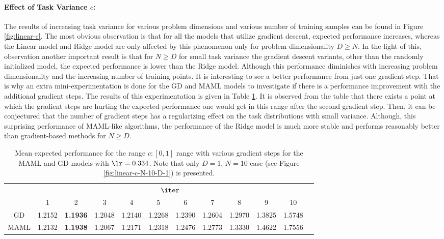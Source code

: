 \paragraph{Effect of Task Variance $c$:} The results of increasing task variance for various problem dimensions and various number of training samples can be found in Figure \ref{fig:linear-c}. The most obvious observation is that for all the models that utilize gradient descent, expected performance increases, whereas the Linear model and Ridge model are only affected by this phenomenon only for problem dimensionality $D\geq N$. In the light of this, observation another important result is that for $N\geq D$  for small task variance the gradient descent variants, other than the randomly initialized model, the expected performance is lower than the Ridge model. Although this performance diminishes with increasing problem dimensionality and the increasing number of training points. It is interesting to see a better performance from just one gradient step. That is why an extra mini-experimentation is done for the GD and MAML models to investigate if there is a performance improvement with the additional gradient steps. The results of this experimentation is given in Table \ref{tab:zoom}. It is observed from the table that there exists a point at which the gradient steps are hurting the expected performance one would get in this range after the second gradient step. Then, it can be conjectured that the number of gradient steps has a regularizing effect on the task distributions with small variance. Although, this surprising performance of MAML-like algorithms, the performance of the Ridge model is much more stable and performs reasonably better than gradient-based methods for $N\geq D$.

\begin{table}
  \centering
  \caption{Mean expected performance for the range $c:[0,1]$ range with various gradient steps for the MAML and GD models with $\lr=0.334$. Note that only $D=1$, $N=10$ case (see Figure \ref{fig:linear-c-N-10-D-1}) is presented.}\label{tab:zoom}
  \begin{tabular}{c|c|c|c|c|c|c|c|c|c|c|c|}
    \cline{2-11}
     & \multicolumn{10}{|c|}{$\iter$}\\
    \cline{2-11}
     & 1 & 2 & 3 & 4 & 5 & 6 & 7 & 8 & 9 & 10\\
    \hline
    \multicolumn{1}{|c|}{GD} & 1.2152 &  \textbf{1.1936} & 1.2048 & 1.2140 &  1.2268 & 1.2390 & 1.2604 & 1.2970 &1.3825 & 1.5748\\
    \hline
    \multicolumn{1}{|c|}{MAML} & 1.2132 & \textbf{1.1938} & 1.2067 & 1.2171 & 1.2318 & 1.2476 & 1.2773 & 1.3330 & 1.4622 & 1.7556  \\
    \hline
    \end{tabular}
\end{table}

